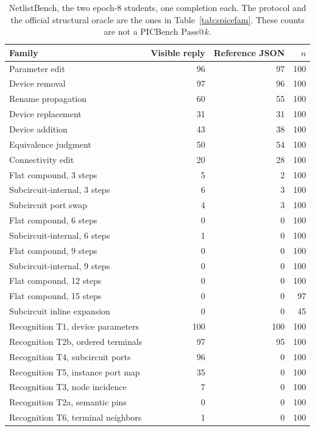 \documentclass[11pt]{article}
\makeatletter
\newcommand{\passk}[1]{\mathrm{Pass@}#1}
\makeatother
\begin{document}
\begin{table}[H]
\caption{NetlistBench, the two epoch-8 students, one completion each.
The protocol and the official structural oracle are the ones in Table~\ref{tab:spicefam}.
These counts are not a PICBench $\passk{k}$.}
\label{tab:spicesft}
\begin{center}
\begin{small}
\begin{tabular}{lrrr}
\toprule
Family & Visible reply & Reference JSON & $n$ \\
\midrule
Parameter edit & 96 & 97 & 100 \\
Device removal & 97 & 96 & 100 \\
Rename propagation & 60 & 55 & 100 \\
Device replacement & 31 & 31 & 100 \\
Device addition & 43 & 38 & 100 \\
Equivalence judgment & 50 & 54 & 100 \\
Connectivity edit & 20 & 28 & 100 \\
Flat compound, 3 steps & 5 & 2 & 100 \\
Subcircuit-internal, 3 steps & 6 & 3 & 100 \\
Subcircuit port swap & 4 & 3 & 100 \\
Flat compound, 6 steps & 0 & 0 & 100 \\
Subcircuit-internal, 6 steps & 1 & 0 & 100 \\
Flat compound, 9 steps & 0 & 0 & 100 \\
Subcircuit-internal, 9 steps & 0 & 0 & 100 \\
Flat compound, 12 steps & 0 & 0 & 100 \\
Flat compound, 15 steps & 0 & 0 & 97 \\
Subcircuit inline expansion & 0 & 0 & 45 \\
\midrule
Recognition T1, device parameters & 100 & 100 & 100 \\
Recognition T2b, ordered terminals & 97 & 95 & 100 \\
Recognition T4, subcircuit ports & 96 & 0 & 100 \\
Recognition T5, instance port map & 35 & 0 & 100 \\
Recognition T3, node incidence & 7 & 0 & 100 \\
Recognition T2a, semantic pins & 0 & 0 & 100 \\
Recognition T6, terminal neighbors & 1 & 0 & 100 \\
\bottomrule
\end{tabular}
\end{small}
\end{center}
\end{table}
\end{document}
